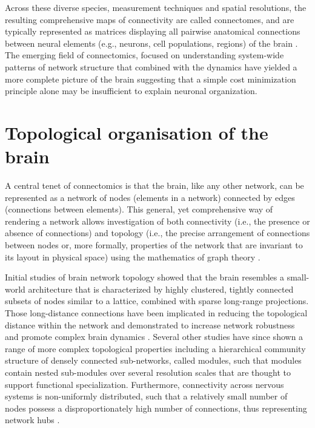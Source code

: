 Across these diverse species, measurement techniques and spatial resolutions, the resulting comprehensive maps of connectivity are called connectomes, and are typically represented as matrices displaying all pairwise anatomical connections between neural elements (e.g., neurons, cell populations, regions) of the brain \citep{Sporns2005}. The emerging field of connectomics, focused on understanding system-wide patterns of network structure that combined with the dynamics have yielded a more complete picture of the brain suggesting that a simple cost minimization principle alone may be insufficient to explain neuronal organization.

\section{Topological organisation of the brain}

A central tenet of connectomics is that the brain, like any other network, can be represented as a network of nodes (elements in a network) connected by edges (connections between elements). This general, yet comprehensive way of rendering a network allows investigation of both connectivity (i.e., the presence or absence of connections) and topology (i.e., the precise arrangement of connections between nodes or, more formally, properties of the network that are invariant to its layout in physical space) using the mathematics of graph theory \citep{Barabasi2016}.

Initial studies of brain network topology showed that the brain resembles a small-world architecture \citep{Bassett2006,Gygi1999,Hilgetag2004,Sporns2004,Watts1998} that is characterized by highly clustered, tightly connected subsets of nodes similar to a lattice, combined with sparse long-range projections. Those long-distance connections have been implicated in reducing the topological distance within the network \citep{Bullmore2012,Sporns2004,VandenHeuvel2011} and demonstrated to increase network robustness and promote complex brain dynamics \citep{Betzel2018}. Several other studies have since shown a range of more complex topological properties including a hierarchical community structure of densely connected sub-networks, called modules, such that modules contain nested sub-modules over several resolution scales \citep{Bullmore1997,Meunier2010a,Towlson2013} that are thought to support functional specialization. Furthermore, connectivity across nervous systems is non-uniformly distributed, such that a relatively small number of nodes possess a disproportionately high number of connections, thus representing network hubs
\citep{Towlson2013,VandenHeuvel2011}.

